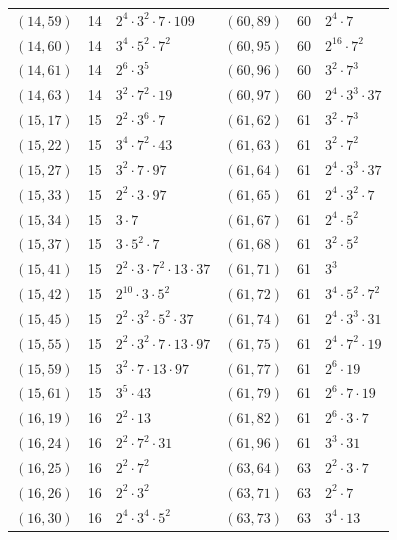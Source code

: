 \documentclass[11pt]{article}
\begin{document}
\begin{longtable}{@{}lrl@{\qquad}lrl@{}}
$(14,59)$ & 14 & $2^{4}\cdot 3^{2}\cdot 7\cdot 109$ & $(60,89)$ & 60 & $2^{4}\cdot 7$\\
$(14,60)$ & 14 & $3^{4}\cdot 5^{2}\cdot 7^{2}$ & $(60,95)$ & 60 & $2^{16}\cdot 7^{2}$\\
$(14,61)$ & 14 & $2^{6}\cdot 3^{5}$ & $(60,96)$ & 60 & $3^{2}\cdot 7^{3}$\\
$(14,63)$ & 14 & $3^{2}\cdot 7^{2}\cdot 19$ & $(60,97)$ & 60 & $2^{4}\cdot 3^{3}\cdot 37$\\
$(15,17)$ & 15 & $2^{2}\cdot 3^{6}\cdot 7$ & $(61,62)$ & 61 & $3^{2}\cdot 7^{3}$\\
$(15,22)$ & 15 & $3^{4}\cdot 7^{2}\cdot 43$ & $(61,63)$ & 61 & $3^{2}\cdot 7^{2}$\\
$(15,27)$ & 15 & $3^{2}\cdot 7\cdot 97$ & $(61,64)$ & 61 & $2^{4}\cdot 3^{3}\cdot 37$\\
$(15,33)$ & 15 & $2^{2}\cdot 3\cdot 97$ & $(61,65)$ & 61 & $2^{4}\cdot 3^{2}\cdot 7$\\
$(15,34)$ & 15 & $3\cdot 7$ & $(61,67)$ & 61 & $2^{4}\cdot 5^{2}$\\
$(15,37)$ & 15 & $3\cdot 5^{2}\cdot 7$ & $(61,68)$ & 61 & $3^{2}\cdot 5^{2}$\\
$(15,41)$ & 15 & $2^{2}\cdot 3\cdot 7^{2}\cdot 13\cdot 37$ & $(61,71)$ & 61 & $3^{3}$\\
$(15,42)$ & 15 & $2^{10}\cdot 3\cdot 5^{2}$ & $(61,72)$ & 61 & $3^{4}\cdot 5^{2}\cdot 7^{2}$\\
$(15,45)$ & 15 & $2^{2}\cdot 3^{2}\cdot 5^{2}\cdot 37$ & $(61,74)$ & 61 & $2^{4}\cdot 3^{3}\cdot 31$\\
$(15,55)$ & 15 & $2^{2}\cdot 3^{2}\cdot 7\cdot 13\cdot 97$ & $(61,75)$ & 61 & $2^{4}\cdot 7^{2}\cdot 19$\\
$(15,59)$ & 15 & $3^{2}\cdot 7\cdot 13\cdot 97$ & $(61,77)$ & 61 & $2^{6}\cdot 19$\\
$(15,61)$ & 15 & $3^{5}\cdot 43$ & $(61,79)$ & 61 & $2^{6}\cdot 7\cdot 19$\\
$(16,19)$ & 16 & $2^{2}\cdot 13$ & $(61,82)$ & 61 & $2^{6}\cdot 3\cdot 7$\\
$(16,24)$ & 16 & $2^{2}\cdot 7^{2}\cdot 31$ & $(61,96)$ & 61 & $3^{3}\cdot 31$\\
$(16,25)$ & 16 & $2^{2}\cdot 7^{2}$ & $(63,64)$ & 63 & $2^{2}\cdot 3\cdot 7$\\
$(16,26)$ & 16 & $2^{2}\cdot 3^{2}$ & $(63,71)$ & 63 & $2^{2}\cdot 7$\\
$(16,30)$ & 16 & $2^{4}\cdot 3^{4}\cdot 5^{2}$ & $(63,73)$ & 63 & $3^{4}\cdot 13$\\

\end{longtable}
\end{document}
